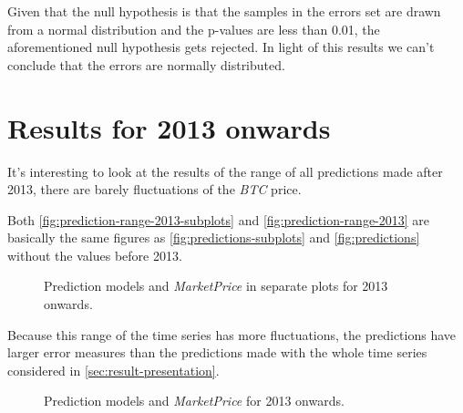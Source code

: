 Given that the null hypothesis is that the samples in the errors set
are drawn from a normal distribution and the p-values are less than
0.01, the aforementioned null hypothesis gets rejected. In light of
this results we can't conclude that the errors are normally
distributed.

\section{Results for 2013 onwards}
\label{sec:results-for-2013-onwards}

It's interesting to look at the results of the range of all
predictions made after 2013, there are barely fluctuations of the
\textit{BTC} price.

Both \autoref{fig:prediction-range-2013-subplots} and
\autoref{fig:prediction-range-2013} are basically the same figures as
\autoref{fig:predictions-subplots} and \autoref{fig:predictions}
without the values before 2013.

\begin{figure}[bth]
  \caption{Prediction models and \textit{MarketPrice} in separate
    plots for 2013 onwards.}
  \label{fig:prediction-range-2013-subplots}
\end{figure}

Because this range of the time series has more fluctuations, the
predictions have larger error measures than the predictions made with
the whole time series considered in \autoref{sec:result-presentation}.

\begin{figure}[bth]
  \caption{Prediction models and \textit{MarketPrice} for 2013 onwards.}
  \label{fig:prediction-range-2013}
\end{figure}


